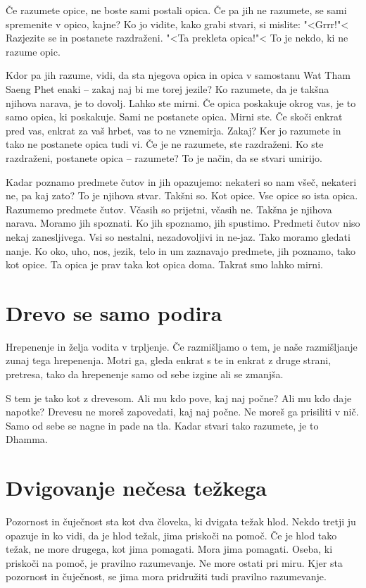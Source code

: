 Če razumete opice, ne boste sami postali opica. Če pa jih ne razumete, se sami spremenite v opico, kajne? Ko jo vidite, kako grabi stvari, si mislite: "<Grrr!"< Razjezite se in postanete razdraženi. "<Ta prekleta opica!"< To je nekdo, ki ne razume opic.

Kdor pa jih razume, vidi, da sta njegova opica in opica v samostanu Wat Tham Saeng Phet enaki – zakaj naj bi me torej jezile? Ko razumete, da je takšna njihova narava, je to dovolj. Lahko ste mirni. Če opica poskakuje okrog vas, je to samo opica, ki poskakuje. Sami ne postanete opica. Mirni ste. Če skoči enkrat pred vas, enkrat za vaš hrbet, vas to ne vznemirja. Zakaj? Ker jo razumete in tako ne postanete opica tudi vi. Če je ne razumete, ste razdraženi. Ko ste razdraženi, postanete opica – razumete? To je način, da se stvari umirijo.

Kadar poznamo predmete čutov in jih opazujemo: nekateri so nam všeč, nekateri ne, pa kaj zato? To je njihova stvar. Takšni so. Kot opice. Vse opice so ista opica. Razumemo predmete čutov. Včasih so prijetni, včasih ne. Takšna je njihova narava. Moramo jih spoznati. Ko jih spoznamo, jih spustimo. Predmeti čutov niso nekaj zanesljivega. Vsi so nestalni, nezadovoljivi in ne-jaz. Tako moramo gledati nanje. Ko oko, uho, nos, jezik, telo in um zaznavajo predmete, jih poznamo, tako kot opice. Ta opica je prav taka kot opica doma. Takrat smo lahko mirni.

\section{Drevo se samo podira}

Hrepenenje in želja vodita v trpljenje. Če razmišljamo o tem, je naše razmišljanje zunaj tega hrepenenja. Motri ga, gleda enkrat s te in enkrat z druge strani, pretresa, tako da hrepenenje samo od sebe izgine ali se zmanjša.

S tem je tako kot z drevesom. Ali mu kdo pove, kaj naj počne? Ali mu kdo daje napotke? Drevesu ne moreš zapovedati, kaj naj počne. Ne moreš ga prisiliti v nič. Samo od sebe se nagne in pade na tla. Kadar stvari tako razumete, je to Dhamma.

\section{Dvigovanje nečesa težkega}

Pozornost in čuječnost sta kot dva človeka, ki dvigata težak hlod. Nekdo tretji ju opazuje in ko vidi, da je hlod težak, jima priskoči na pomoč. Če je hlod tako težak, ne more drugega, kot jima pomagati. Mora jima pomagati. Oseba, ki priskoči na pomoč, je pravilno razumevanje. Ne more ostati pri miru. Kjer sta pozornost in čuječnost, se jima mora pridružiti tudi pravilno razumevanje.

